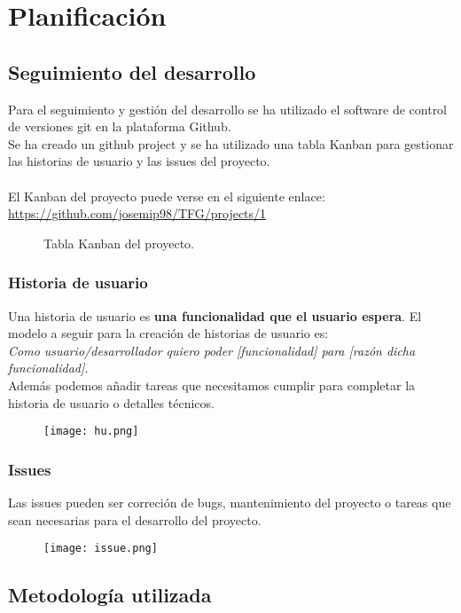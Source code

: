 \chapter{Planificación}

\section{Seguimiento del desarrollo}
Para el seguimiento y gestión del desarrollo se ha utilizado el software de control de versiones
git\cite{git} en la plataforma Github\cite{Github}.
\\
Se ha creado un github project y se ha utilizado una tabla Kanban para gestionar las historias 
de usuario y las issues del proyecto.
\\\\
El Kanban del proyecto puede verse en el siguiente enlace:
\url{https://github.com/josemip98/TFG/projects/1}

\begin{figure}[!h]
  \centering
  \noindent{}
  \caption{Tabla Kanban del proyecto.}
\end{figure}

\subsection{Historia de usuario}\label{subsec:hu}
Una historia de usuario es \textbf{una funcionalidad que el usuario espera}.
El modelo a seguir para la creación de historias de usuario es:
\\ \textit{Como usuario/desarrollador quiero poder [funcionalidad] para [razón dicha funcionalidad].}\\

Además podemos añadir tareas que necesitamos cumplir para completar la historia de usuario o detalles técnicos.

\begin{figure}[H]
	\centering	
	\texttt{[image: hu.png]}
	\end{figure}

\subsection{Issues}\label{subsec:issue}
Las issues pueden ser correción de bugs, mantenimiento del proyecto o tareas que sean necesarias para el desarrollo del proyecto.

\begin{figure}[H]
	\centering	
	\texttt{[image: issue.png]}
	\end{figure}

\section{Metodología utilizada}

